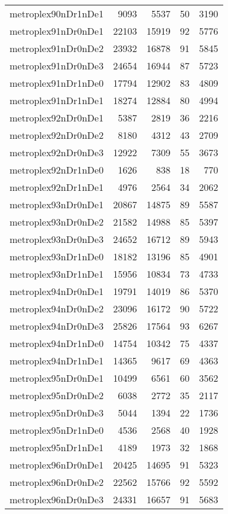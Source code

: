 \begin{tabular}{lrrrr}
metroplex90nDr1nDe1 & 9093 & 5537 & 50 & 3190 \\
metroplex91nDr0nDe1 & 22103 & 15919 & 92 & 5776 \\
metroplex91nDr0nDe2 & 23932 & 16878 & 91 & 5845 \\
metroplex91nDr0nDe3 & 24654 & 16944 & 87 & 5723 \\
metroplex91nDr1nDe0 & 17794 & 12902 & 83 & 4809 \\
metroplex91nDr1nDe1 & 18274 & 12884 & 80 & 4994 \\
metroplex92nDr0nDe1 & 5387 & 2819 & 36 & 2216 \\
metroplex92nDr0nDe2 & 8180 & 4312 & 43 & 2709 \\
metroplex92nDr0nDe3 & 12922 & 7309 & 55 & 3673 \\
metroplex92nDr1nDe0 & 1626 & 838 & 18 & 770 \\
metroplex92nDr1nDe1 & 4976 & 2564 & 34 & 2062 \\
metroplex93nDr0nDe1 & 20867 & 14875 & 89 & 5587 \\
metroplex93nDr0nDe2 & 21582 & 14988 & 85 & 5397 \\
metroplex93nDr0nDe3 & 24652 & 16712 & 89 & 5943 \\
metroplex93nDr1nDe0 & 18182 & 13196 & 85 & 4901 \\
metroplex93nDr1nDe1 & 15956 & 10834 & 73 & 4733 \\
metroplex94nDr0nDe1 & 19791 & 14019 & 86 & 5370 \\
metroplex94nDr0nDe2 & 23096 & 16172 & 90 & 5722 \\
metroplex94nDr0nDe3 & 25826 & 17564 & 93 & 6267 \\
metroplex94nDr1nDe0 & 14754 & 10342 & 75 & 4337 \\
metroplex94nDr1nDe1 & 14365 & 9617 & 69 & 4363 \\
metroplex95nDr0nDe1 & 10499 & 6561 & 60 & 3562 \\
metroplex95nDr0nDe2 & 6038 & 2772 & 35 & 2117 \\
metroplex95nDr0nDe3 & 5044 & 1394 & 22 & 1736 \\
metroplex95nDr1nDe0 & 4536 & 2568 & 40 & 1928 \\
metroplex95nDr1nDe1 & 4189 & 1973 & 32 & 1868 \\
metroplex96nDr0nDe1 & 20425 & 14695 & 91 & 5323 \\
metroplex96nDr0nDe2 & 22562 & 15766 & 92 & 5592 \\
metroplex96nDr0nDe3 & 24331 & 16657 & 91 & 5683 \\

\end{tabular}
